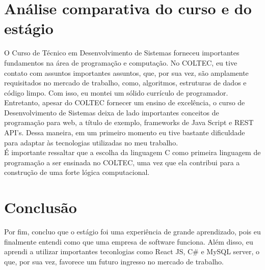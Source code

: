 \documentclass[12pt]{article}
\begin{document}
\section{Análise comparativa do curso e do estágio}
O Curso de Técnico em Desenvolvimento de Sistemas forneceu importantes fundamentos na área de programação e computação. No COLTEC, eu tive contato com assuntos importantes assuntos, que, por sua vez, são amplamente requisitados no mercado de trabalho, como, algoritmos, estruturas de dados e código limpo. Com isso, eu montei um sólido currículo de programador.
\\
Entretanto, apesar do COLTEC fornecer um ensino de excelência, o curso de Desenvolvimento de Sistemas deixa de lado importantes conceitos de programação para web, a título de exemplo, frameworks de Java Script e REST API's. Dessa maneira, em um primeiro momento eu tive bastante dificuldade para adaptar às tecnologias utilizadas no meu trabalho.
\\
É importante ressaltar que a escolha da linguagem C como primeira linguagem de programação a ser ensinada no COLTEC, uma vez que ela contribui para a construção de uma forte lógica computacional.

\section{Conclusão}
Por fim, concluo que o estágio foi uma experiência de grande aprendizado, pois eu finalmente entendi como que uma empresa de software funciona. Além disso, eu aprendi a utilizar importantes teconlogias como React JS, C\# e MySQL server, o que, por sua vez, favorece um futuro ingresso no mercado de trabalho. 
\end{document}
